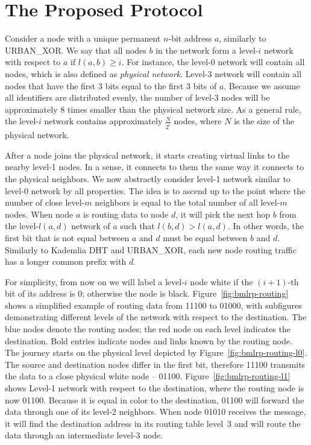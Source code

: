 \documentclass[conference]{IEEEtran}
\theoremstyle{definition}
\newcommand{\urbanxor}{URBAN\_XOR}
\begin{document}
\section{The Proposed Protocol}
\label{sec:bmlrp}

Consider a node with a unique permanent $n$-bit address $a$, similarly to \urbanxor. We say that all nodes $b$ in the network form a level-$i$ network with respect to $a$ if $l(a,b) \ge i$. For instance, the level-0 network will contain all nodes, which is also defined as \emph{physical network}. Level-3 network will contain all nodes that have the first 3 bits equal to the first 3 bits of $a$. Because we assume all identifiers are distributed evenly, the number of level-3 nodes will be approximately 8 times smaller than the physical network size. As a general rule, the level-$i$ network contains approximately $\frac{N}{2^i}$ nodes, where $N$ is the size of the physical network.

After a node joins the physical network, it starts creating virtual links to the nearby level-1 nodes. In a sense, it connects to them the same way it connects to the physical neighbors. We now abstractly consider level-1 network similar to level-0 network by all properties. The idea is to ascend up to the point where the number of close level-$m$ neighbors is equal to the total number of all level-$m$ nodes. When node $a$ is routing data to node $d$, it will pick the next hop $b$ from the level-$l(a,d)$ network of $a$ such that $l(b,d) > l(a,d)$. In other words, the first bit that is not equal between $a$ and $d$ must be equal between $b$ and $d$. Similarly to Kademlia DHT and \urbanxor, each new node routing traffic has a longer common prefix with $d$.



For simplicity, from now on we will label a level-$i$ node white if the $(i+1)$-th bit of its address is 0; otherwise the node is black. Figure~\ref{fig:bmlrp-routing} shows a simplified example of routing data from 11100 to 01000, with subfigures demonstrating different levels of the network with respect to the destination. The blue nodes denote the routing nodes; the red node on each level indicates the destination. Bold entries indicate nodes and links known by the routing node. The journey starts on the physical level depicted by Figure~\ref{fig:bmlrp-routing-l0}. The source and destination nodes differ in the first bit, therefore 11100 transmits the data to a close physical white node -- 01100. Figure~\ref{fig:bmlrp-routing-l1} shows Level-1 network with respect to the destination, where the routing node is now 01100. Because it is equal in color to the destination, 01100 will forward the data through one of its level-2 neighbors. When node 01010 receives the message, it will find the destination address in its routing table level~3 and will route the data through an intermediate level-3 node.
\end{document}
